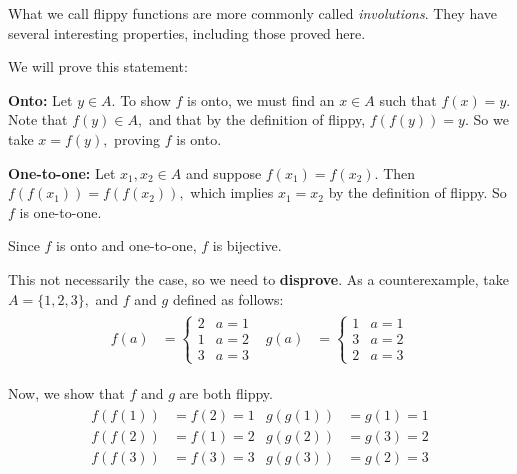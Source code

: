 \documentclass[12pt]{exam}
\begin{document}
\begin{solution}
What we call flippy functions are more commonly called \textit{involutions}. They have several interesting properties, including those proved here.

\begin{qparts}
    \item We will prove this statement:
    
    \textbf{Onto:} Let $y\in A.$ To show $f$ is onto, we must find an $x\in A$ such that $f(x)=y.$ Note that $f(y)\in A,$ and that by the definition of flippy, $f(f(y))=y.$ So we take $x=f(y),$ proving $f$ is onto.
    
    \textbf{One-to-one:} Let $x_1,x_2\in A$ and suppose $f(x_1)=f(x_2).$ Then $f(f(x_1))=f(f(x_2)),$ which implies $x_1=x_2$ by the definition of flippy. So $f$ is one-to-one.
    
    Since $f$ is onto and one-to-one, $f$ is bijective.
\end{qparts}
\begin{qparts}[resume]
    \item This not necessarily the case, so we need to \textbf{disprove}. As a counterexample, take $A=\{1,2,3\},$ and $f$ and $g$ defined as follows:
    \begin{align*}
        \begin{split}
        f(a)&=\begin{cases}
            2 & a=1 \\
            1 & a=2 \\
            3 & a=3
        \end{cases}
        \end{split}
        \begin{split}
        g(a)&=\begin{cases}
            1 & a=1 \\
            3 & a=2 \\
            2 & a=3
        \end{cases}
        \end{split}
    \end{align*}

    Now, we show that $f$ and $g$ are both flippy.
    \begin{align*}
        \begin{split}
            f(f(1)) &= f(2) = 1\\
            f(f(2)) &= f(1) = 2\\
            f(f(3)) &= f(3) = 3
        \end{split}
        \begin{split}
            g(g(1)) &= g(1) = 1\\
            g(g(2)) &= g(3) = 2\\
            g(g(3)) &= g(2) = 3
        \end{split}
    \end{align*}
    

\end{qparts}
\end{solution}
\end{document}
